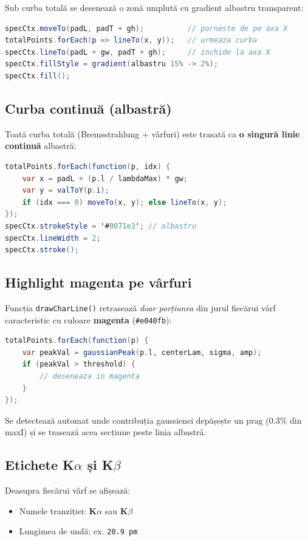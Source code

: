 \documentclass[12pt,a4paper]{article}
\begin{document}
Sub curba totală se desenează o zonă umplută cu gradient albastru transparent:

\begin{lstlisting}[language=Java]
specCtx.moveTo(padL, padT + gh);          // porneste de pe axa X
totalPoints.forEach(p => lineTo(x, y));   // urmeaza curba
specCtx.lineTo(padL + gw, padT + gh);     // inchide la axa X
specCtx.fillStyle = gradient(albastru 15% -> 2%);
specCtx.fill();
\end{lstlisting}

\subsection{Curba continuă (albastră)}

Toată curba totală (Bremsstrahlung + vârfuri) este trasată ca \textbf{o singură linie continuă} albastră:

\begin{lstlisting}[language=Java]
totalPoints.forEach(function(p, idx) {
    var x = padL + (p.l / lambdaMax) * gw;
    var y = valToY(p.i);
    if (idx === 0) moveTo(x, y); else lineTo(x, y);
});
specCtx.strokeStyle = '#0071e3'; // albastru
specCtx.lineWidth = 2;
specCtx.stroke();
\end{lstlisting}

\subsection{Highlight magenta pe vârfuri}

Funcția \texttt{drawCharLine()} retrasează \emph{doar porțiunea} din jurul fiecărui vârf caracteristic cu culoare \textcolor{peakcolor}{\textbf{magenta}} (\texttt{\#e040fb}):

\begin{lstlisting}[language=Java]
totalPoints.forEach(function(p) {
    var peakVal = gaussianPeak(p.l, centerLam, sigma, amp);
    if (peakVal > threshold) {
        // deseneaza in magenta
    }
});
\end{lstlisting}

Se detectează automat unde contribuția gaussienei depășește un prag ($0.3\%$ din maxI) și se trasează acea secțiune peste linia albastră.

\subsection{Etichete K$\alpha$ și K$\beta$}

Deasupra fiecărui vârf se afișează:
\begin{itemize}[leftmargin=2em]
    \item Numele tranziției: \textcolor{peakcolor}{\textbf{K$\alpha$}} sau \textcolor{peakcolor}{\textbf{K$\beta$}}
    \item Lungimea de undă: ex. \textcolor{peakcolor}{\texttt{20.9 pm}}
\end{itemize}
\end{document}
